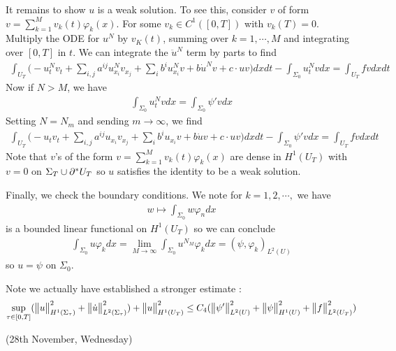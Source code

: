 \documentclass[12pt,a4paper]{report}
\newenvironment{proof}
{\begin{changemargin}{1cm}{0.5cm} 
	}%
	{\end{changemargin}
}
\begin{document}
\begin{proof}
\quad It remains to show $u$ is a weak solution. To see this, consider $v$ of form $v= \sum_{k=1}^M v_k(t) \varphi_k(x)$. For some $v_k \in C^1([0,T])$ with $v_k(T) =0$. Multiply the ODE for $u^N$ by $v_K(t)$, summing over $k=1, \cdots, M$ and integrating over $[0,T]$ in $t$. We can integrate the $\ddot{u}^N$ term by parts to find
\begin{align*}
\int_{U_T} \Big( -u_t^N v_t + \sum_{i,j}a^{ij}u_{x_i}^N v_{x_j} + \sum_{i}b^i u^N_{x_i} v + b\dot{u}^N v + c\cdot uv \Big) dxdt - \int_{\Sigma_0} u_t^N v dx = \int_{U_T} fv dxdt
\end{align*}
Now if $N>M$, we have
\begin{align*}
\int_{\Sigma_0} u^N_t vdx = \int_{\Sigma_0} \psi' vdx 
\end{align*}
Setting $N = N_m$ and sending $m\rightarrow \infty$, we find 
\begin{align*}
\int_{U_T} \Big( -u_t v_t + \sum_{i,j} a^{ij} u_{x_i}v_{x_j} + \sum_i b^i u_{x_i} v + b\dot{u} v + c\cdot uv \Big) dxdt - \int_{\Sigma_0} \psi' v dx = \int_{U_T} fv dxdt
\end{align*}
Note that $v$'s of the form $v= \sum_{k=1}^M v_k(t) \varphi_k(x)$ are dense in $H^1(U_T)$ with $v=0$ on $\Sigma_T \cup \partial^* U_T$ so $u$ satisfies  the identity to be a weak solution.

\quad Finally, we check the boundary conditions. We note for $k=1,2,\cdots,$ we have
\begin{align*}
w \mapsto \int_{\Sigma_0} w \varphi_n dx
\end{align*}
is a bounded linear functional on $H^1(U_T)$ so we can conclude
\begin{align*}
\int_{\Sigma_0} u\varphi_k dx = \lim_{M\rightarrow \infty} \int_{\Sigma_0} u^{N_M} \varphi_k dx = (\psi, \varphi_k)_{L^2(U)} 
\end{align*}
so $u = \psi$ on $\Sigma_0$.

\quad Note we actually have established a stronger estimate :
\begin{align*}
\sup_{\tau \in [0,T]} ( \bigl\lVert u\bigr\rVert_{H^1(\Sigma_{\tau})}^2 + \bigl\lVert\dot{u}\bigr\rVert_{L^2(\Sigma_{\tau})}^2) + \bigl\lVert u\bigr\rVert_{H^1(U_T)}^2 \leq C_4(\bigl\lVert\psi'\bigr\rVert_{L^2(U)}^2 + \bigl\lVert\psi\bigr\rVert_{H^1(U)}^2 + \bigl\lVert f\bigr\rVert_{L^2(U_T)}^2)
\end{align*}

\eop
\end{proof}
\s

\newday

(28th November, Wednesday)
\s
\end{document}
